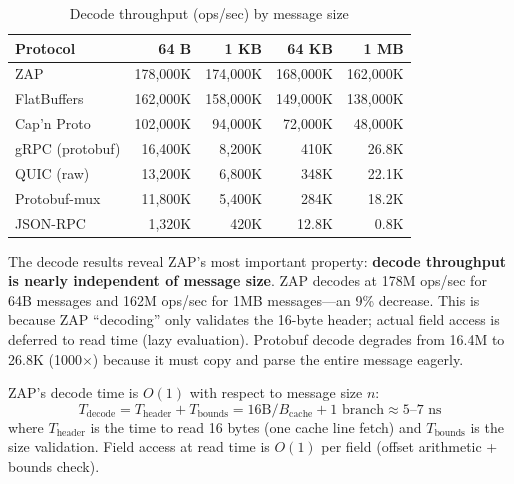 \begin{table}[h]
\centering
\caption{Decode throughput (ops/sec) by message size}
\label{tab:decode-sizes}
\begin{tabular}{lrrrr}
\toprule
\textbf{Protocol} & \textbf{64 B} & \textbf{1 KB} & \textbf{64 KB} & \textbf{1 MB} \\
\midrule
\rowcolor{luxblue!10}
ZAP & 178,000K & 174,000K & 168,000K & 162,000K \\
FlatBuffers & 162,000K & 158,000K & 149,000K & 138,000K \\
Cap'n Proto & 102,000K & 94,000K & 72,000K & 48,000K \\
gRPC (protobuf) & 16,400K & 8,200K & 410K & 26.8K \\
QUIC (raw) & 13,200K & 6,800K & 348K & 22.1K \\
Protobuf-mux & 11,800K & 5,400K & 284K & 18.2K \\
JSON-RPC & 1,320K & 420K & 12.8K & 0.8K \\
\bottomrule
\end{tabular}
\end{table}

The decode results reveal ZAP's most important property: \textbf{decode throughput is nearly independent of message size}. ZAP decodes at 178M ops/sec for 64B messages and 162M ops/sec for 1MB messages---an 9\% decrease. This is because ZAP ``decoding'' only validates the 16-byte header; actual field access is deferred to read time (lazy evaluation). Protobuf decode degrades from 16.4M to 26.8K (1000$\times$) because it must copy and parse the entire message eagerly.

\begin{theorem}
ZAP's decode time is $O(1)$ with respect to message size $n$:
\[
T_{\text{decode}} = T_{\text{header}} + T_{\text{bounds}} = 16\text{B}/B_{\text{cache}} + 1\text{ branch} \approx 5\text{--}7\text{ ns}
\]
where $T_{\text{header}}$ is the time to read 16 bytes (one cache line fetch) and $T_{\text{bounds}}$ is the size validation. Field access at read time is $O(1)$ per field (offset arithmetic + bounds check).
\end{theorem}

